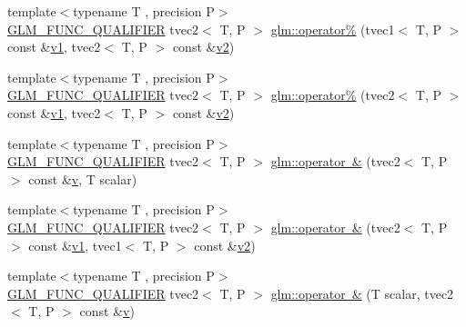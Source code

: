 \begin{DoxyCompactItemize}
\item 
{\footnotesize template$<$typename T , precision P$>$ }\\\mbox{\hyperlink{setup_8hpp_a33fdea6f91c5f834105f7415e2a64407}{G\+L\+M\+\_\+\+F\+U\+N\+C\+\_\+\+Q\+U\+A\+L\+I\+F\+I\+ER}} tvec2$<$ T, P $>$ \mbox{\hyperlink{namespaceglm_ab363226196f05f9eca3eed9367d78282}{glm\+::operator\%}} (tvec1$<$ T, P $>$ const \&\mbox{\hyperlink{glad_8h_a0779c3b73f9aa3a0ac5b0139b5d291d9}{v1}}, tvec2$<$ T, P $>$ const \&\mbox{\hyperlink{glad_8h_a9a09a1837922b2b806f4589096a52049}{v2}})
\item 
{\footnotesize template$<$typename T , precision P$>$ }\\\mbox{\hyperlink{setup_8hpp_a33fdea6f91c5f834105f7415e2a64407}{G\+L\+M\+\_\+\+F\+U\+N\+C\+\_\+\+Q\+U\+A\+L\+I\+F\+I\+ER}} tvec2$<$ T, P $>$ \mbox{\hyperlink{namespaceglm_a52ea1bf9fb9e94e2f6f37b0fab7e9e3e}{glm\+::operator\%}} (tvec2$<$ T, P $>$ const \&\mbox{\hyperlink{glad_8h_a0779c3b73f9aa3a0ac5b0139b5d291d9}{v1}}, tvec2$<$ T, P $>$ const \&\mbox{\hyperlink{glad_8h_a9a09a1837922b2b806f4589096a52049}{v2}})
\item 
{\footnotesize template$<$typename T , precision P$>$ }\\\mbox{\hyperlink{setup_8hpp_a33fdea6f91c5f834105f7415e2a64407}{G\+L\+M\+\_\+\+F\+U\+N\+C\+\_\+\+Q\+U\+A\+L\+I\+F\+I\+ER}} tvec2$<$ T, P $>$ \mbox{\hyperlink{namespaceglm_a71c4fc4219ec879803cde0fe1a50da1a}{glm\+::operator \&}} (tvec2$<$ T, P $>$ const \&\mbox{\hyperlink{glad_8h_a14cfbe2fc2234f5504618905b69d1e06}{v}}, T scalar)
\item 
{\footnotesize template$<$typename T , precision P$>$ }\\\mbox{\hyperlink{setup_8hpp_a33fdea6f91c5f834105f7415e2a64407}{G\+L\+M\+\_\+\+F\+U\+N\+C\+\_\+\+Q\+U\+A\+L\+I\+F\+I\+ER}} tvec2$<$ T, P $>$ \mbox{\hyperlink{namespaceglm_a1c0a4288ac416a434779c8d047bcee49}{glm\+::operator \&}} (tvec2$<$ T, P $>$ const \&\mbox{\hyperlink{glad_8h_a0779c3b73f9aa3a0ac5b0139b5d291d9}{v1}}, tvec1$<$ T, P $>$ const \&\mbox{\hyperlink{glad_8h_a9a09a1837922b2b806f4589096a52049}{v2}})
\item 
{\footnotesize template$<$typename T , precision P$>$ }\\\mbox{\hyperlink{setup_8hpp_a33fdea6f91c5f834105f7415e2a64407}{G\+L\+M\+\_\+\+F\+U\+N\+C\+\_\+\+Q\+U\+A\+L\+I\+F\+I\+ER}} tvec2$<$ T, P $>$ \mbox{\hyperlink{namespaceglm_a58346ba27c35e0f93039a55ee96ee670}{glm\+::operator \&}} (T scalar, tvec2$<$ T, P $>$ const \&\mbox{\hyperlink{glad_8h_a14cfbe2fc2234f5504618905b69d1e06}{v}})

\end{DoxyCompactItemize}
